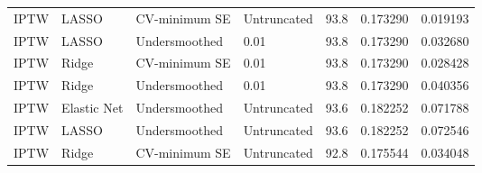 \begin{longtable}[l]{lllllll}
IPTW & LASSO & CV-minimum SE & Untruncated & 93.8 & 0.173290 & 0.019193\\
IPTW & LASSO & Undersmoothed & 0.01 & 93.8 & 0.173290 & 0.032680\\
IPTW & Ridge & CV-minimum SE & 0.01 & 93.8 & 0.173290 & 0.028428\\
IPTW & Ridge & Undersmoothed & 0.01 & 93.8 & 0.173290 & 0.040356\\
IPTW & Elastic Net & Undersmoothed & Untruncated & 93.6 & 0.182252 & 0.071788\\
IPTW & LASSO & Undersmoothed & Untruncated & 93.6 & 0.182252 & 0.072546\\
IPTW & Ridge & CV-minimum SE & Untruncated & 92.8 & 0.175544 & 0.034048\\
\bottomrule
\end{longtable}
